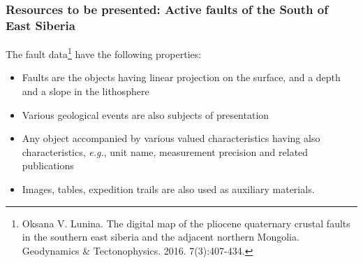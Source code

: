 \documentclass[10pt]{beamer}
\begin{document}
\begin{frame}
  \frametitle{Resources to be presented: Active faults of the South of
    East Siberia}
  The fault data\footnote{Oksana V. Lunina.  The digital map of the pliocene quaternary crustal faults in the southern east siberia and the adjacent northern Mongolia. Geodynamics \& Tectonophysics. 2016. 7(3):407-434. 
} have the following properties:
  \begin{itemize}
  \item Faults are the objects having linear projection on the surface, and a depth and a slope in the lithosphere
  \item Various geological events are also subjects of presentation
  \item Any object accompanied by various valued characteristics having also characteristics, \emph{e.g.}, unit name, measurement precision and related publications
  \item Images, tables, expedition trails are also used as auxiliary materials.
  \end{itemize}
\end{frame}
\end{document}
